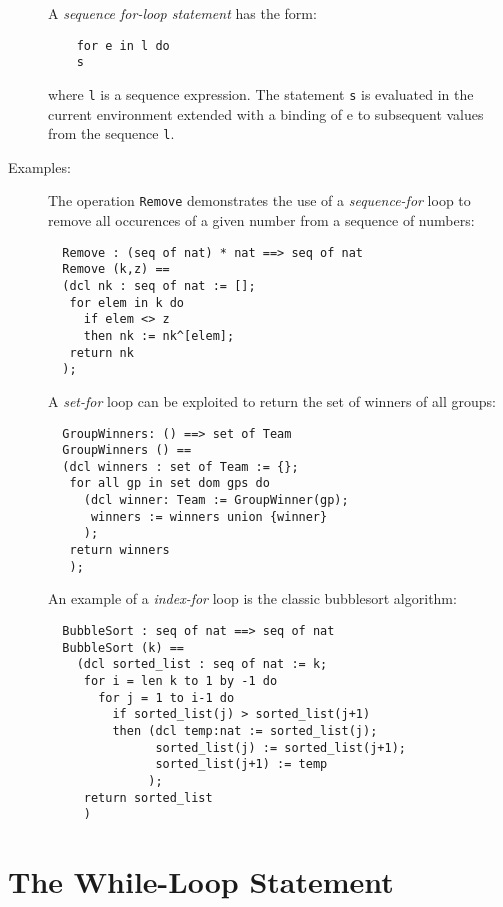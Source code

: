 \documentclass{overturerepchap}
\begin{document}
\begin{description}
  A {\it sequence for-loop statement\/} has the form:
  \begin{lstlisting}
    for e in l do
    s
  \end{lstlisting}
  where {\tt l} is a sequence expression. The statement {\tt s} is
  evaluated in the current environment extended with a binding of e to
  subsequent values from the sequence {\tt l}. 

\item[Examples:] The operation \texttt{Remove} demonstrates the use of a 
  \textit{sequence-for} loop to remove all occurences of a given number from a 
  sequence of numbers:
  \begin{lstlisting}
  Remove : (seq of nat) * nat ==> seq of nat
  Remove (k,z) ==
  (dcl nk : seq of nat := [];
   for elem in k do
     if elem <> z
     then nk := nk^[elem];
   return nk
  );
  \end{lstlisting}
\label{removeDef}
  A \textit{set-for} loop can be exploited to return the set of winners of 
  all groups:
  \begin{lstlisting}
  GroupWinners: () ==> set of Team
  GroupWinners () ==
  (dcl winners : set of Team := {};
   for all gp in set dom gps do
     (dcl winner: Team := GroupWinner(gp);
      winners := winners union {winner}
     );
   return winners
   );
  \end{lstlisting}
  An example of a \textit{index-for} loop is the classic bubblesort 
  algorithm:
  \begin{lstlisting}
  BubbleSort : seq of nat ==> seq of nat
  BubbleSort (k) ==
    (dcl sorted_list : seq of nat := k;
     for i = len k to 1 by -1 do
       for j = 1 to i-1 do
         if sorted_list(j) > sorted_list(j+1)
         then (dcl temp:nat := sorted_list(j);
               sorted_list(j) := sorted_list(j+1);
               sorted_list(j+1) := temp
              );
     return sorted_list
     )
\end{lstlisting}
\end{description}

\section{The While-Loop Statement}
\end{document}

